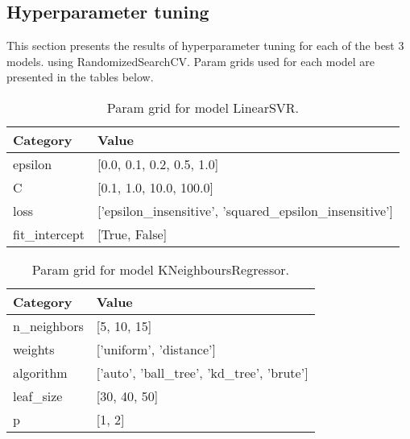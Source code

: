 \documentclass{article}%
\begin{document}
\subsection{Hyperparameter tuning}%
\label{subsec:Hyperparametertuning}%

%
This section presents the results of hyperparameter tuning for each of the best 3 models. using RandomizedSearchCV. Param grids used for each model are presented in the tables below.%


\begin{table}[H]%
\begin{center}%
\renewcommand{\arraystretch}{1.5}%
\begin{tabular}{l l}%
\hline%
\textbf{Category}&\textbf{Value}\\%
\hline%
epsilon&{[}0.0, 0.1, 0.2, 0.5, 1.0{]}\\%
C&{[}0.1, 1.0, 10.0, 100.0{]}\\%
loss&{[}'epsilon\_insensitive', 'squared\_epsilon\_insensitive'{]}\\%
fit\_intercept&{[}True, False{]}\\%
\hline%
\end{tabular}%
\end{center}%
\caption{Param grid for model LinearSVR.}%
\end{table}

%


\begin{table}[H]%
\begin{center}%
\renewcommand{\arraystretch}{1.5}%
\begin{tabular}{l l}%
\hline%
\textbf{Category}&\textbf{Value}\\%
\hline%
n\_neighbors&{[}5, 10, 15{]}\\%
weights&{[}'uniform', 'distance'{]}\\%
algorithm&{[}'auto', 'ball\_tree', 'kd\_tree', 'brute'{]}\\%
leaf\_size&{[}30, 40, 50{]}\\%
p&{[}1, 2{]}\\%
\hline%
\end{tabular}%
\end{center}%
\caption{Param grid for model KNeighboursRegressor.}%
\end{table}

%
\end{document}
